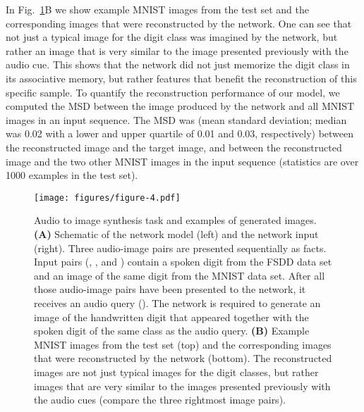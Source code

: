 \documentclass{article}
\begin{document}
In Fig.~\ref{fig:fig4}B we show example MNIST images from the test set and the corresponding images that were reconstructed by the network. One can see that not just a typical image for the digit class was imagined by the network, but rather an image that is very similar to the image presented previously with the audio cue. This shows that the network did not just memorize the digit class in its associative memory, but rather features that benefit the reconstruction of this specific sample.
To quantify the reconstruction performance of our model, we computed the \gls{MSD} between the image produced by the network and all MNIST images in an input sequence. The \gls{MSD} was  (mean  standard deviation; median was \num{0.02} with a lower and upper quartile of \num{0.01} and \num{0.03}, respectively) between the reconstructed image and the target image, and  between the reconstructed image and the two other MNIST images in the input sequence (statistics are over \num{1000} examples in the test set). 

\begin{figure}\centering
\texttt{[image: figures/figure-4.pdf]}
\caption{Audio to image synthesis task and examples of generated images.
\textbf{(A)} Schematic of the network model (left) and the network input (right). Three audio-image pairs are presented sequentially as facts. Input pairs (, , and ) contain a spoken digit from the FSDD data set and an image of the same digit from the MNIST data set. After all those audio-image pairs have been presented to the network, it receives an audio query (). The network is required to generate an image of the handwritten digit that appeared together with the spoken digit of the same class as the audio query.
\textbf{(B)} Example MNIST images from the test set (top) and the corresponding images that were reconstructed by the network (bottom). The reconstructed images are not just typical images for the digit classes, but rather images that are very similar to the images presented previously with the audio cues (compare the three rightmost image pairs).}
\label{fig:fig4}
\end{figure}
\end{document}
